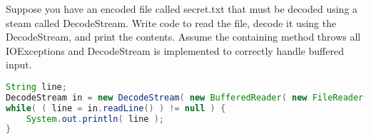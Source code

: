 Suppose you have an encoded file called secret.txt that must be decoded using a steam called DecodeStream.  Write code to read the file, decode it using the DecodeStream, and print the contents.  Assume the containing method throws all IOExceptions and DecodeStream is implemented to correctly handle buffered input.

\begin{answer}
\begin{lstlisting}[language=java]
String line;
DecodeStream in = new DecodeStream( new BufferedReader( new FileReader( "secret.txt" ) ) );
while( ( line = in.readLine() ) != null ) {
	System.out.println( line );
}
\end{lstlisting}
\end{answer}

\vspace{24pt}
